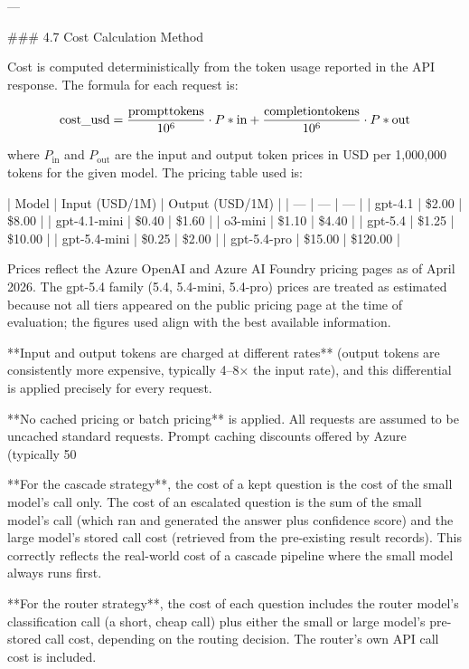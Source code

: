 ---

### 4.7 Cost Calculation Method

Cost is computed deterministically from the token usage reported in the API response. The formula for each request is:

$$\text{cost\_usd} = \frac{\text{prompt\*tokens}}{10^6} \cdot P*\text{in} + \frac{\text{completion\*tokens}}{10^6} \cdot P*\text{out}$$

where $P_\text{in}$ and $P_\text{out}$ are the input and output token prices in USD per 1,000,000 tokens for the given model. The pricing table used is:

| Model | Input (USD/1M) | Output (USD/1M) |
| --- | --- | --- |
| gpt-4.1 | \$2.00 | \$8.00 |
| gpt-4.1-mini | \$0.40 | \$1.60 |
| o3-mini | \$1.10 | \$4.40 |
| gpt-5.4 | \$1.25 | \$10.00 |
| gpt-5.4-mini | \$0.25 | \$2.00 |
| gpt-5.4-pro | \$15.00 | \$120.00 |

Prices reflect the Azure OpenAI and Azure AI Foundry pricing pages as of April 2026. The gpt-5.4 family (5.4, 5.4-mini, 5.4-pro) prices are treated as estimated because not all tiers appeared on the public pricing page at the time of evaluation; the figures used align with the best available information.

**Input and output tokens are charged at different rates** (output tokens are consistently more expensive, typically 4–8× the input rate), and this differential is applied precisely for every request.

**No cached pricing or batch pricing** is applied. All requests are assumed to be uncached standard requests. Prompt caching discounts offered by Azure (typically 50%

**For the cascade strategy**, the cost of a kept question is the cost of the small model's call only. The cost of an escalated question is the sum of the small model's call (which ran and generated the answer plus confidence score) and the large model's stored call cost (retrieved from the pre-existing result records). This correctly reflects the real-world cost of a cascade pipeline where the small model always runs first.

**For the router strategy**, the cost of each question includes the router model's classification call (a short, cheap call) plus either the small or large model's pre-stored call cost, depending on the routing decision. The router's own API call cost is included.

